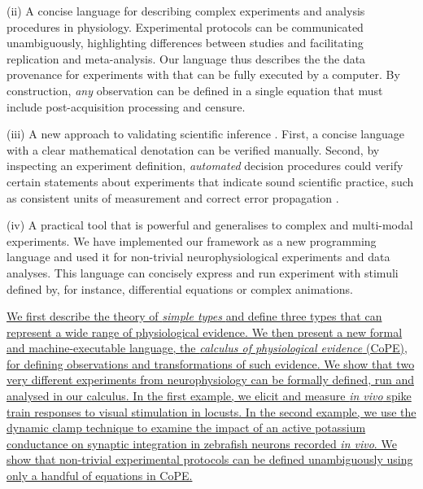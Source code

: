 (ii) A concise language for describing complex experiments and
analysis procedures in physiology. Experimental protocols can be
communicated unambiguously, highlighting differences between studies
and facilitating replication and meta-analysis. Our language thus
describes the the data provenance
\cite{Pool2002,MacKenzie-Graham2008, VanHorn2009} for experiments
with that can be fully executed by a computer. By construction,
\emph{any} observation can be defined in a single equation that must
include post-acquisition processing and censure.

(iii) A new approach to validating scientific inference
\cite{Editors2003, Editors2010}. First, a concise language with a
clear mathematical denotation can be verified manually. Second, by
inspecting an experiment definition, \emph{automated} decision procedures
could verify certain statements about experiments that indicate sound
scientific practice, such as consistent units of measurement
\cite{Kennedy1997} and correct error propagation \cite{Taylor1997}.

(iv) A practical tool that is powerful and generalises to complex and
multi-modal experiments. We have implemented our framework as a new
programming language and used it for non-trivial neurophysiological
experiments and data analyses. This language can concisely express and
run experiment with stimuli defined by, for instance, differential
equations or complex animations.

\underline{We first describe the theory of \emph{simple types} \cite{Pierce2002,
  Hindley2008} and define three types that can represent a wide range
of physiological evidence. We then present a new formal and
machine-executable language, the \emph{calculus of physiological
  evidence} (CoPE), for defining observations and transformations of
such evidence. We show that two very different experiments
  from neurophysiology can be formally defined, run and analysed in
  our calculus. In the first example, we elicit and measure \emph{in
    vivo} spike train responses to visual stimulation in locusts. In
  the second example, we use the dynamic clamp technique to examine
  the impact of an active potassium conductance on synaptic
  integration in zebrafish neurons recorded \emph{in vivo}. We show
that non-trivial experimental protocols can be defined unambiguously
using only a handful of equations in CoPE.}

